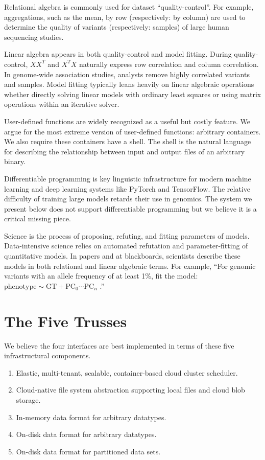 \documentclass[10pt,a4paper%
]{article}
\begin{document}
Relational algebra is commonly used for dataset ``quality-control''. For example, aggregations, such as the mean, by row (respectively: by column) are used to determine the quality of variants (respectively: samples) of large human sequencing studies.

Linear algebra appears in both quality-control and model fitting.
During quality-control, $XX^T$ and $X^TX$ naturally express row correlation and column correlation.
In genome-wide association studies, analysts remove highly correlated variants and samples.
Model fitting typically leans heavily on linear algebraic operations whether directly solving linear models with ordinary least squares or using matrix operations within an iterative solver.

User-defined functions are widely recognized as a useful but costly feature.
We argue for the most extreme version of user-defined functions: arbitrary containers.
We also require these containers have a shell.
The shell is the natural language for describing the relationship between input and output files of an arbitrary binary.

Differentiable programming is key linguistic infrastructure for modern machine learning and deep learning systems like PyTorch and TensorFlow.
The relative difficulty of training large models retards their use in genomics.
The system we present below does not support differentiable programming but we believe it is a critical missing piece.

Science is the process of proposing, refuting, and fitting parameters of models.
Data-intensive science relies on automated refutation and parameter-fitting of quantitative models.
In papers and at blackboards, scientists describe these models in both relational and linear algebraic terms.
For example, ``For genomic variants with an allele frequency of at least 1\%, fit the model:
$\mathrm{phenotype} \sim \mathrm{GT} + \mathrm{PC}_0 \cdots \mathrm{PC}_n$
.''

\section{The Five Trusses}

We believe the four interfaces are best implemented in terms of these five infrastructural
components.

\begin{enumerate}
\item Elastic, multi-tenant, scalable, container-based cloud cluster scheduler.
\item Cloud-native file system abstraction supporting local files and cloud blob storage.
\item In-memory data format for arbitrary datatypes.
\item On-disk data format for arbitrary datatypes.
\item On-disk data format for partitioned data sets.
\end{enumerate}
\end{document}
